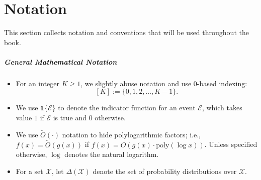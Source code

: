 \chapter*{Notation}

This section collects notation and conventions that will be used throughout the book.

\paragraph{General Mathematical Notation}
\begin{itemize}
\item For an integer $K\ge 1$, we slightly abuse notation and use 0-based indexing:
  \[
    [K] := \{0,1,2,\ldots,K-1\}.
  \]

\item We use $\mathds{1}\{\mathcal{E}\}$ to denote the indicator function for an event $\mathcal{E}$,
  which takes value $1$ if $\mathcal{E}$ is true and $0$ otherwise.

\item We use $\tilde{O}(\cdot)$ notation to hide polylogarithmic factors; i.e., $f(x) = \tilde{O}(g(x))$
  if $f(x) = O(g(x) \cdot \text{poly}(\log x))$. Unless specified otherwise, $\log$ denotes the natural logarithm.

\item For a set $\mathcal{X}$, let $\Delta(\mathcal{X})$ denote the set of probability
  distributions over $\mathcal{X}$.
\end{itemize}

